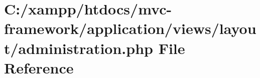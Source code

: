 \hypertarget{views_2layout_2_administration_8php}{}\section{C\+:/xampp/htdocs/mvc-\/framework/application/views/layout/administration.php File Reference}
\label{views_2layout_2_administration_8php}
